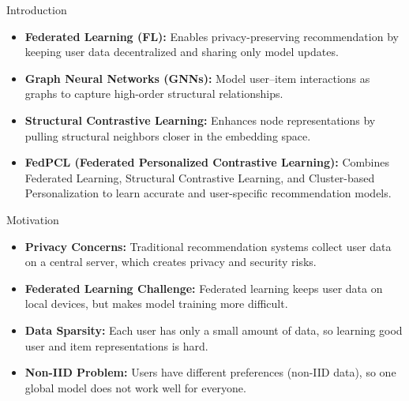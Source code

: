 \documentclass{beamer}
\begin{document}
\begin{frame}{Introduction}
\small
\begin{itemize}

\item \textbf{Federated Learning (FL):} Enables privacy-preserving recommendation by keeping user data decentralized and sharing only model updates.

\item \textbf{Graph Neural Networks (GNNs):} Model user–item interactions as graphs to capture high-order structural relationships.

\item \textbf{Structural Contrastive Learning:} Enhances node representations by pulling structural neighbors closer in the embedding space.

\item \textbf{FedPCL (Federated Personalized Contrastive Learning):} Combines Federated Learning, Structural Contrastive Learning, and Cluster-based Personalization to learn accurate and user-specific recommendation models.

\end{itemize}

\end{frame}
\begin{frame}{Motivation}
\small
\begin{itemize}

  \item \textbf{Privacy Concerns:}  
  Traditional recommendation systems collect user data on a central server,
  which creates privacy and security risks.

  \item \textbf{Federated Learning Challenge:}  
  Federated learning keeps user data on local devices,
  but makes model training more difficult.

  \item \textbf{Data Sparsity:}  
  Each user has only a small amount of data,
  so learning good user and item representations is hard.

  \item \textbf{Non-IID Problem:}  
  Users have different preferences (non-IID data),
  so one global model does not work well for everyone.

\end{itemize}
\end{frame}
\end{document}
